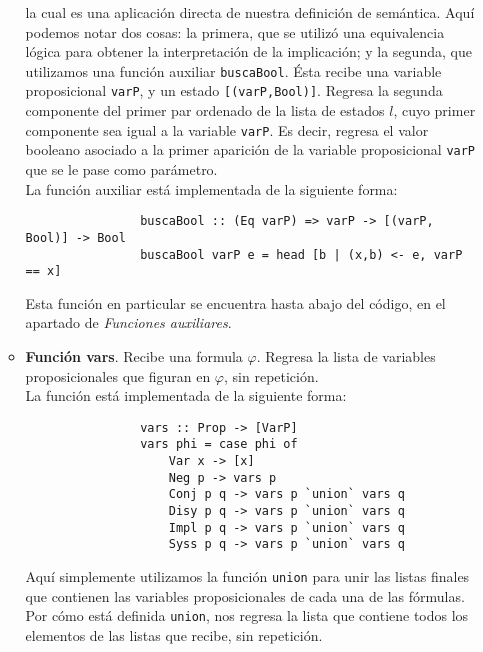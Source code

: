 \documentclass[letterpaper,12pt]{article}
\begin{document}
\begin{itemize}
\begin{itemize}
            la cual es una aplicación directa de nuestra definición de 
            semántica. Aquí podemos notar dos cosas: la primera, que se 
            utilizó una equivalencia lógica para obtener la interpretación 
            de la implicación; y la segunda, que utilizamos una función 
            auxiliar \texttt{buscaBool}. Ésta recibe una variable 
            proposicional \texttt{varP}, y un estado \texttt{[(varP,Bool)]}.
            Regresa la segunda componente del primer par ordenado de la 
            lista de estados $l$, cuyo primer componente sea igual a la
            variable \texttt{varP}. Es decir, regresa el valor booleano 
            asociado a la primer aparición de la variable proposicional 
            \texttt{varP}  que se le pase como parámetro. \\
            La función auxiliar está implementada de la siguiente forma:
            \begin{lstlisting}
                buscaBool :: (Eq varP) => varP -> [(varP, Bool)] -> Bool
                buscaBool varP e = head [b | (x,b) <- e, varP == x]
            \end{lstlisting}
            
            Esta función en particular se encuentra hasta abajo del código, en
            el apartado de \textit{Funciones auxiliares}.

            \item \textbf{Función vars}. Recibe una formula $\varphi$. Regresa
            la lista de variables proposicionales que figuran en $\varphi$, 
            sin repetición. \\
            La función está implementada de la siguiente forma:
            \begin{lstlisting}
                vars :: Prop -> [VarP]
                vars phi = case phi of
                    Var x -> [x]
                    Neg p -> vars p
                    Conj p q -> vars p `union` vars q
                    Disy p q -> vars p `union` vars q
                    Impl p q -> vars p `union` vars q
                    Syss p q -> vars p `union` vars q
            \end{lstlisting}

            Aquí simplemente utilizamos la función \texttt{union} para unir 
            las listas finales que contienen las variables proposicionales 
            de cada una de las fórmulas. Por cómo está definida 
            \texttt{union}, nos regresa la lista que contiene todos los 
            elementos de las listas que recibe, sin repetición.


\end{itemize}
\end{itemize}
\end{document}
